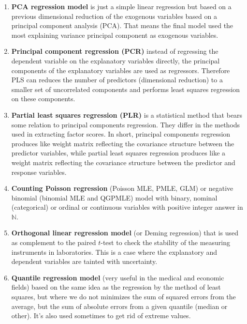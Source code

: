 \begin{enumerate}
		\item \textbf{PCA regression model} is just a simple linear regression but based on a previous dimensional reduction of the exogenous variables based on a principal component analysis (PCA). That means the final model used the most explaining variance principal component as exogenous variables.
		
		\item \textbf{Principal component regression (PCR)} instead of regressing the dependent variable on the explanatory variables directly, the principal components of the explanatory variables are used as regressors. Therefore PLS can reduces the number of predictors (dimensional reduction) to a smaller set of uncorrelated components and performs least squares regression on these components.
		
		\item \textbf{Partial least squares regression (PLR)} is a statistical method that bears some relation to principal components regression.  They differ in the methods used in extracting factor scores. In short, principal components regression produces like weight matrix reflecting the covariance structure between the predictor variables, while partial least squares regression produces like a weight matrix reflecting the covariance structure between the predictor and response variables.
		
		\item \textbf{Counting Poisson regression} (Poisson MLE, PMLE, GLM) or negative binomial (binomial MLE and QGPMLE) model with binary, nominal (categorical) or ordinal or continuous variables with positive integer answer in $\mathbb{N}$.
		
		\item \textbf{Orthogonal linear regression model} (or Deming regression) that is used as complement to the paired $t$-test to check the stability of the measuring instruments in laboratories. This is a case where the explanatory and dependent variables are tainted with uncertainty.
		
		\item \textbf{Quantile regression model} (very useful in the medical and economic fields) based on the same idea as the regression by the method of least squares, but where we do not minimizes the sum of squared errors from the average, but the sum of absolute errors from a given quantile (median or other). It's also used sometimes to get rid of extreme values.
		

\end{enumerate}
